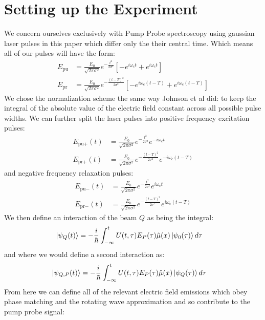 \section{Setting up the Experiment}
We concern ourselves exclusively with Pump Probe spectroscopy using gaussian laser pulses in this paper which differ only the their central time.  Which means all of our pulses will have the form:
\begin{align}
	E_{\text{pu}} &= \frac{E_0}{\sqrt{2 \pi \sigma^2}} e^{-\frac{t^2}{2 \sigma^2} } \left[ -e^{i \omega_c t} + e^{i \omega_c t} \right]\\
	E_{\text{pr}} &= \frac{E_0}{\sqrt{2 \pi \sigma^2}} e^{-\frac{\left(t-T\right)^2}{2 \sigma^2} } \left[ -e^{i \omega_c \left(t-T\right)} + e^{i \omega_c \left(t-T\right)} \right]
\end{align}
We chose the normalization scheme the same way Johnson et al did: to keep the integral of the absolute value of the electric field constant across all possible pulse widths.  We can further split the laser pulses into positive frequency excitation pulses:
\begin{align}
	E_{\text{pu}+}(t) &= \frac{E_0}{\sqrt{2 \pi \sigma^2}} e^{-\frac{t^2}{2 \sigma^2} } e^{-i \omega_c t} \\
	E_{\text{pr}+}(t) &= \frac{E_0}{\sqrt{2 \pi \sigma^2}} e^{-\frac{\left(t-T\right)^2}{2 \sigma^2} }  e^{-i \omega_c \left(t-T\right)}
\end{align}
and negative frequency relaxation pulses:
\begin{align}
	E_{\text{pu}-}(t) &= \frac{E_0}{\sqrt{2 \pi \sigma^2}} e^{-\frac{t^2}{2 \sigma^2} } e^{i \omega_c t} \\
	E_{\text{pr}-}(t) &= \frac{E_0}{\sqrt{2 \pi \sigma^2}} e^{-\frac{\left(t-T\right)^2}{2 \sigma^2} }  e^{i \omega_c \left(t-T\right)}
\end{align}
We then define an interaction of the beam $Q$ as being the integral:
\begin{align}
	\ket{\psi_{Q} (t)}  &= -\frac{i}{\hbar} \int_{-\infty}^{t} U(t, \tau) E_{P}(\tau) \hat{\mu}(x) \ket{\psi_0 (\tau)} d \tau
\end{align}
and where we would define a second interaction as:
\begin{align}
	\ket{\psi_{Q, P} (t)}  &= -\frac{i}{\hbar} \int_{-\infty}^{t} U(t, \tau) E_P (\tau) \hat{\mu}(x) \ket{\psi_Q (\tau)} d \tau
\end{align}
From here we can define all of the relevant electric field emissions which obey phase matching and the rotating wave approximation and so contribute to the pump probe signal:
